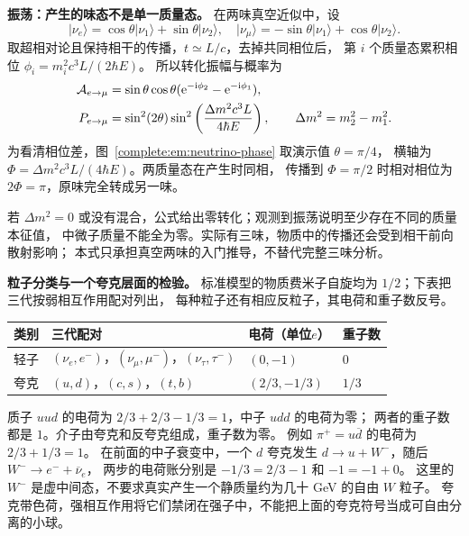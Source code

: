 \noindent\textbf{振荡：产生的味态不是单一质量态。}
在两味真空近似中，设
\[
 |\nu_e\rangle=\cos\theta|\nu_1\rangle+\sin\theta|\nu_2\rangle,
 \quad
 |\nu_\mu\rangle=-\sin\theta|\nu_1\rangle+\cos\theta|\nu_2\rangle.
\]
取超相对论且保持相干的传播，$t\simeq L/c$，去掉共同相位后，
第 $i$ 个质量态累积相位 $\phi_i=m_i^2c^3L/(2\hbar E)$。
所以转化振幅与概率为
\[
 \begin{aligned}
 \mathcal A_{e\to\mu}
 &=\sin\theta\cos\theta(\mathrm e^{-\mathrm i\phi_2}-\mathrm e^{-\mathrm i\phi_1}),\\
 P_{e\to\mu}
 &=\sin^2(2\theta)\sin^2\left(\frac{\Delta m^2c^3L}{4\hbar E}\right),
 \qquad \Delta m^2=m_2^2-m_1^2.
 \end{aligned}
\]
为看清相位差，图~\ref{complete:em:neutrino-phase} 取演示值 $\theta=\pi/4$，
横轴为 $\Phi=\Delta m^2c^3L/(4\hbar E)$。两质量态在产生时同相，
传播到 $\Phi=\pi/2$ 时相对相位为 $2\Phi=\pi$，原味完全转成另一味。

\begin{qualityfigure}
\end{qualityfigure}

若 $\Delta m^2=0$ 或没有混合，公式给出零转化；观测到振荡说明至少存在不同的质量本征值，
中微子质量不能全为零。实际有三味，物质中的传播还会受到相干前向散射影响；
本式只承担真空两味的入门推导，不替代完整三味分析。

\noindent\textbf{粒子分类与一个夸克层面的检验。}
标准模型的物质费米子自旋均为 $1/2$；下表把三代按弱相互作用配对列出，
每种粒子还有相应反粒子，其电荷和重子数反号。
\begin{center}\small
\begin{tabular}{p{.14\linewidth}p{.37\linewidth}p{.19\linewidth}p{.13\linewidth}}
\hline
类别 & 三代配对 & 电荷（单位$e$） & 重子数\\\hline
轻子 & $(\nu_e,e^-)$，$(\nu_\mu,\mu^-)$，$(\nu_\tau,\tau^-)$ & $(0,-1)$ & $0$\\
夸克 & $(u,d)$，$(c,s)$，$(t,b)$ & $(2/3,-1/3)$ & $1/3$\\\hline
\end{tabular}
\end{center}
质子 $uud$ 的电荷为 $2/3+2/3-1/3=1$，中子 $udd$ 的电荷为零；
两者的重子数都是 $1$。介子由夸克和反夸克组成，重子数为零。
例如 $\pi^+=u\overline d$ 的电荷为 $2/3+1/3=1$。
在前面的中子衰变中，一个 $d$ 夸克发生
$d\to u+W^-$，随后 $W^-\to e^-+\overline\nu_e$，
两步的电荷账分别是 $-1/3=2/3-1$ 和 $-1=-1+0$。
这里的 $W^-$ 是虚中间态，不要求真实产生一个静质量约为几十 GeV 的自由 $W$ 粒子。
夸克带色荷，强相互作用将它们禁闭在强子中，不能把上面的夸克符号当成可自由分离的小球。

